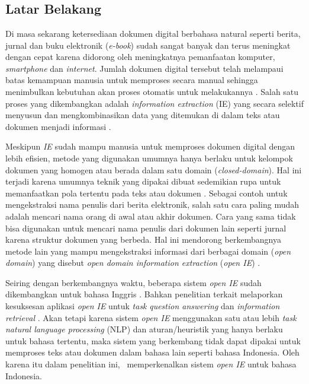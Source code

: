 \chapter{\babSatu}
\label{chap:babSatu}

\section{Latar Belakang}
Di masa sekarang ketersediaan dokumen digital berbahasa natural seperti berita, jurnal dan buku elektronik (\textit{e-book}) sudah sangat banyak dan terus meningkat dengan cepat karena didorong oleh meningkatnya pemanfaatan komputer, \textit{smartphone} dan \textit{internet}. Jumlah dokumen digital tersebut telah melampaui batas kemampuan manusia untuk memproses secara manual sehingga menimbulkan kebutuhan akan proses otomatis untuk melakukannya \citep{banko2007open}. Salah satu proses yang dikembangkan adalah \textit{information extraction} (IE) yang secara selektif menyusun dan mengkombinasikan data yang ditemukan di dalam teks atau dokumen menjadi informasi \citep{cowie1996information}.

Meskipun \textit{IE} sudah mampu manusia untuk memproses dokumen digital dengan lebih efisien, metode yang digunakan umumnya hanya berlaku untuk kelompok dokumen yang homogen atau berada dalam satu domain (\textit{closed-domain}). Hal ini terjadi karena umumnya teknik yang dipakai dibuat sedemikian rupa untuk memanfaatkan pola tertentu pada teks atau dokumen \citep{cowie1996information}. Sebagai contoh untuk mengekstraksi nama penulis dari berita elektronik, salah satu cara paling mudah adalah mencari nama orang di awal atau akhir dokumen. Cara yang sama tidak bisa digunakan untuk mencari nama penulis dari dokumen lain seperti jurnal karena struktur dokumen yang berbeda. Hal ini mendorong berkembangnya metode lain yang mampu mengekstraksi informasi dari berbagai domain (\textit{open domain}) yang disebut \textit{open domain information extraction} (\textit{open IE}) \citep{banko2007open}.

Seiring dengan berkembangnya waktu, beberapa sistem \textit{open IE} sudah dikembangkan untuk bahasa Inggris \citep{banko2007open,schmitz2012open,angeli2015leveraging}. Bahkan penelitian terkait melaporkan kesuksesan aplikasi \textit{open IE} untuk \textit{task} \textit{question answering} \citep{fader2011identifying} dan \textit{information retrieval} \citep{etzioni2011search}. Akan tetapi karena sistem \textit{open IE} menggunakan satu atau lebih \textit{task natural language processing} (NLP) dan aturan/heuristik yang hanya berlaku untuk bahasa tertentu, maka sistem yang berkembang tidak dapat dipakai untuk memproses teks atau dokumen dalam bahasa lain seperti bahasa Indonesia. Oleh karena itu dalam penelitian ini, \saya~memperkenalkan sistem \textit{open IE} untuk bahasa Indonesia.


